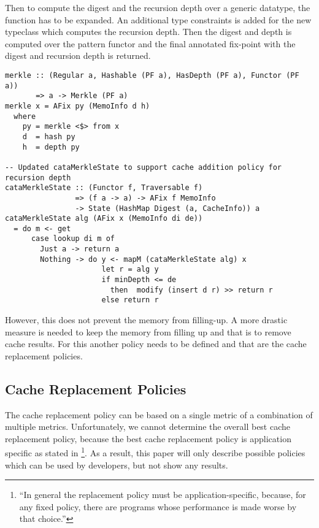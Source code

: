 Then to compute the digest and the recursion depth over a generic datatype, the  function has to be expanded. An additional type constraints  is added for the new typeclass which computes the recursion depth. Then the digest and depth is computed over the pattern functor and the final annotated fix-point with the digest and recursion depth is returned.

\begin{verbatim}
merkle :: (Regular a, Hashable (PF a), HasDepth (PF a), Functor (PF a)) 
       => a -> Merkle (PF a)
merkle x = AFix py (MemoInfo d h)
  where
    py = merkle <$> from x
    d  = hash py
    h  = depth py

-- Updated cataMerkleState to support cache addition policy for recursion depth
cataMerkleState :: (Functor f, Traversable f) 
                => (f a -> a) -> AFix f MemoInfo 
                -> State (HashMap Digest (a, CacheInfo)) a
cataMerkleState alg (AFix x (MemoInfo di de))
  = do m <- get
      case lookup di m of
        Just a -> return a
        Nothing -> do y <- mapM (cataMerkleState alg) x
                      let r = alg y
                      if minDepth <= de
                        then  modify (insert d r) >> return r
                      else return r   
\end{verbatim}

However, this does not prevent the memory from filling-up. A more drastic measure is needed to keep the memory from filling up and that is to remove cache results. For this another policy needs to be defined and that are the cache replacement policies.

\subsection{Cache Replacement Policies}

The cache replacement policy can be based on a single metric of a combination of multiple metrics. Unfortunately, we cannot determine the overall best cache replacement policy, because the best cache replacement policy is application specific as stated in \footnote{``In general the replacement policy must be application-specific, because, for any fixed policy, there are programs whose performance is made worse by that choice.''\cite{acar2003selective}}. As a result, this paper will only describe possible policies which can be used by developers, but not show any results.

